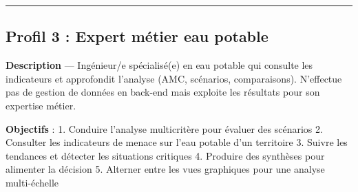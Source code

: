 \documentclass[
  paper=a4,
  oneside  ,captions=tableheading
]{scrartcl}
\begin{document}
\begin{center}\rule{0.5\linewidth}{0.5pt}\end{center}

\subsection{Profil 3 : Expert métier eau
potable}\label{profil-3-expert-muxe9tier-eau-potable}

\textbf{Description} --- Ingénieur/e spécialisé(e) en eau potable qui
consulte les indicateurs et approfondit l'analyse (AMC, scénarios,
comparaisons). N'effectue pas de gestion de données en back-end mais
exploite les résultats pour son expertise métier.

\textbf{Objectifs} : 1. Conduire l'analyse multicritère pour évaluer des
scénarios 2. Consulter les indicateurs de menace sur l'eau potable d'un
territoire 3. Suivre les tendances et détecter les situations critiques
4. Produire des synthèses pour alimenter la décision 5. Alterner entre
les vues graphiques pour une analyse multi-échelle
\end{document}
